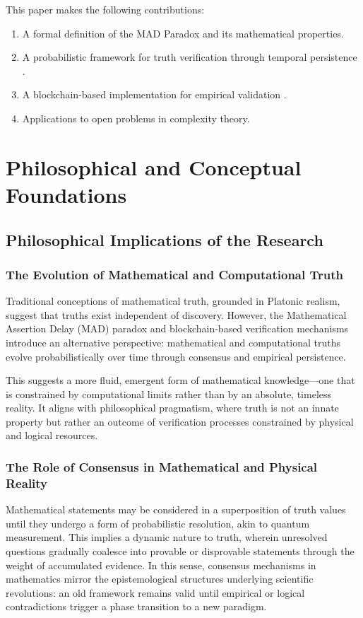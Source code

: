 \documentclass[11pt]{article}
\begin{document}
This paper makes the following contributions:
\begin{enumerate}[label=(\arabic*)]
    \item A formal definition of the MAD Paradox and its mathematical properties.
    \item A probabilistic framework for truth verification through temporal persistence \cite{BenSasson2018}.
    \item A blockchain-based implementation for empirical validation \cite{Buterin2014}.
    \item Applications to open problems in complexity theory.
\end{enumerate}

\section{Philosophical and Conceptual Foundations}
\subsection{Philosophical Implications of the Research}

\subsubsection{The Evolution of Mathematical and Computational Truth}
Traditional conceptions of mathematical truth, grounded in Platonic realism, suggest that truths exist independent of discovery. However, the Mathematical Assertion Delay (MAD) paradox and blockchain-based verification mechanisms introduce an alternative perspective: mathematical and computational truths evolve probabilistically over time through consensus and empirical persistence.

This suggests a more fluid, emergent form of mathematical knowledge—one that is constrained by computational limits rather than by an absolute, timeless reality. It aligns with philosophical pragmatism, where truth is not an innate property but rather an outcome of verification processes constrained by physical and logical resources.

\subsubsection{The Role of Consensus in Mathematical and Physical Reality}
Mathematical statements may be considered in a superposition of truth values until they undergo a form of probabilistic resolution, akin to quantum measurement. This implies a dynamic nature to truth, wherein unresolved questions gradually coalesce into provable or disprovable statements through the weight of accumulated evidence. In this sense, consensus mechanisms in mathematics mirror the epistemological structures underlying scientific revolutions: an old framework remains valid until empirical or logical contradictions trigger a phase transition to a new paradigm.
\end{document}

